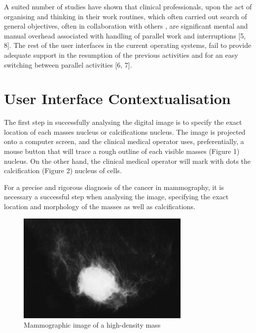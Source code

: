 A  suited  number  of  studies  have  shown  that  clinical  professionals, upon the act of organising and thinking in their work routines, which often carried out search of general objectives, often in collaboration with others \break [9, 10, 11], are significant mental and manual overhead associated with handling of  parallel  work  and  interruptions [5,  8]. The rest of the user  interfaces  in  the  current operating systems, fail to provide adequate support in the resumption of the previous  activities  and  for an  easy  switching  between  parallel  activities [6, 7].

\section{User Interface Contextualisation}

The first step in successfully analysing the digital image is to specify the exact location of each masses nucleus or calcifications nucleus. The image is projected onto a computer screen, and the clinical medical operator uses, preferentially, a mouse button that will trace a rough outline of each visible masses (Figure 1) nucleus. On the other hand, the clinical medical operator will mark with dots the calcification (Figure 2) nucleus of cells.

For a precise and rigorous diagnosis of the cancer in mammography, it is necessary a successful step when analysing the image, specifying the exact location and morphology of the masses as well as calcifications.

\begin{figure}[!hbt]
\centering
\includegraphics[width=0.75\textwidth]{masses.png}
\caption{\label{fig:frog}Mammographic image of a high-density mass
}
\end{figure}

